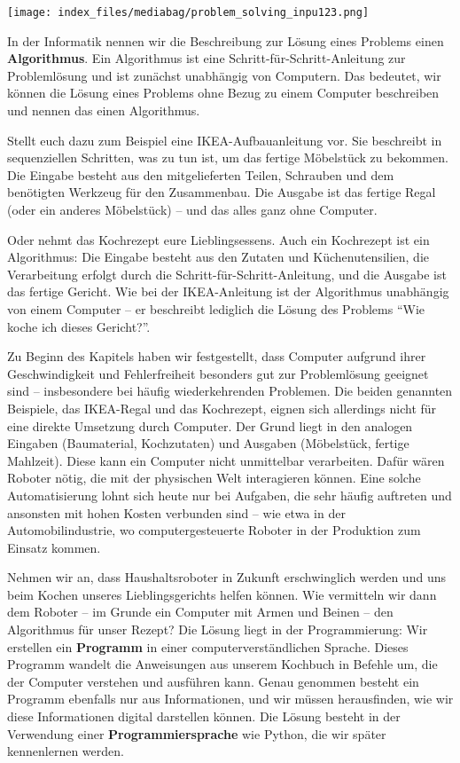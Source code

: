 \documentclass[
  letterpaper,
  DIV=11]{scrreprt}
\begin{document}
\begin{center}
\texttt{[image: index\_files/mediabag/problem\_solving\_inpu123.png]}
\end{center}

In der Informatik nennen wir die Beschreibung zur Lösung eines Problems
einen \textbf{Algorithmus}. Ein Algorithmus ist eine
Schritt-für-Schritt-Anleitung zur Problemlösung und ist zunächst
unabhängig von Computern. Das bedeutet, wir können die Lösung eines
Problems ohne Bezug zu einem Computer beschreiben und nennen das einen
Algorithmus.

Stellt euch dazu zum Beispiel eine IKEA-Aufbauanleitung vor. Sie
beschreibt in sequenziellen Schritten, was zu tun ist, um das fertige
Möbelstück zu bekommen. Die Eingabe besteht aus den mitgelieferten
Teilen, Schrauben und dem benötigten Werkzeug für den Zusammenbau. Die
Ausgabe ist das fertige Regal (oder ein anderes Möbelstück) -- und das
alles ganz ohne Computer.

Oder nehmt das Kochrezept eure Lieblingsessens. Auch ein Kochrezept ist
ein Algorithmus: Die Eingabe besteht aus den Zutaten und
Küchenutensilien, die Verarbeitung erfolgt durch die
Schritt-für-Schritt-Anleitung, und die Ausgabe ist das fertige Gericht.
Wie bei der IKEA-Anleitung ist der Algorithmus unabhängig von einem
Computer -- er beschreibt lediglich die Lösung des Problems ``Wie koche
ich dieses Gericht?''.

Zu Beginn des Kapitels haben wir festgestellt, dass Computer aufgrund
ihrer Geschwindigkeit und Fehlerfreiheit besonders gut zur Problemlösung
geeignet sind -- insbesondere bei häufig wiederkehrenden Problemen. Die
beiden genannten Beispiele, das IKEA-Regal und das Kochrezept, eignen
sich allerdings nicht für eine direkte Umsetzung durch Computer. Der
Grund liegt in den analogen Eingaben (Baumaterial, Kochzutaten) und
Ausgaben (Möbelstück, fertige Mahlzeit). Diese kann ein Computer nicht
unmittelbar verarbeiten. Dafür wären Roboter nötig, die mit der
physischen Welt interagieren können. Eine solche Automatisierung lohnt
sich heute nur bei Aufgaben, die sehr häufig auftreten und ansonsten mit
hohen Kosten verbunden sind -- wie etwa in der Automobilindustrie, wo
computergesteuerte Roboter in der Produktion zum Einsatz kommen.

Nehmen wir an, dass Haushaltsroboter in Zukunft erschwinglich werden und
uns beim Kochen unseres Lieblingsgerichts helfen können. Wie vermitteln
wir dann dem Roboter -- im Grunde ein Computer mit Armen und Beinen --
den Algorithmus für unser Rezept? Die Lösung liegt in der
Programmierung: Wir erstellen ein \textbf{Programm} in einer
computerverständlichen Sprache. Dieses Programm wandelt die Anweisungen
aus unserem Kochbuch in Befehle um, die der Computer verstehen und
ausführen kann. Genau genommen besteht ein Programm ebenfalls nur aus
Informationen, und wir müssen herausfinden, wie wir diese Informationen
digital darstellen können. Die Lösung besteht in der Verwendung einer
\textbf{Programmiersprache} wie Python, die wir später kennenlernen
werden.
\end{document}
